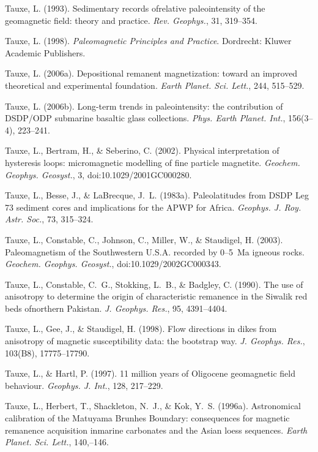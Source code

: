 \documentclass[,plain]{tauxe}
\begin{document}
\begin{thebibliography}{}
\bibitem{}%
Tauxe, L. (1993).
Sedimentary records of\break relative paleointensity of the geomagnetic field: theory and practice.
{\it Rev. Geophys.}, 31, 319--354.

\bibitem{}%
Tauxe, L. (1998).
{\it Paleomagnetic Principles and Practice}.
Dordrecht: Kluwer Academic Publishers.

\bibitem{}%
Tauxe, L. (2006a).
Depositional remanent magnetization: toward an improved theoretical and experimental foundation.
{\it Earth Planet. Sci. Lett.}, 244, 515--529.

\bibitem{}%
Tauxe, L. (2006b).
Long-term trends in paleointensity: the contribution of DSDP/ODP submarine basaltic glass collections.
{\it Phys. Earth Planet. Int.}, 156(3--4), 223--241.

\bibitem{}%
Tauxe, L., Bertram, H., \& Seberino, C. (2002).
Physical interpretation of hysteresis loops: micromagnetic modelling of fine particle magnetite.
{\it Geochem. Geophys. Geosyst.}, 3, doi:10.1029/2001GC000280.

\bibitem{}%
Tauxe, L., Besse, J., \& LaBrecque, J.~L. (1983a).
Paleolatitudes from DSDP Leg 73 sediment cores and implications for the APWP for Africa.
{\it Geophys. J. Roy. Astr. Soc.}, 73, 315--324.

\bibitem{}%
Tauxe, L., Constable, C., Johnson, C., Miller, W., \& Staudigel, H. (2003).
Paleomagnetism of the Southwestern U.S.A. recorded by 0--5~Ma igneous rocks.
{\it Geochem. Geophys. Geosyst.}, doi:10.1029/2002GC000343.

\bibitem{}%
Tauxe, L., Constable, C.~G., Stokking, L.~B., \& Badgley, C. (1990).
The use of anisotropy to determine the origin of characteristic remanence in the Siwalik red beds of\break northern Pakistan.
{\it J. Geophys. Res.}, 95, 4391--4404.

\bibitem{}%
Tauxe, L., Gee, J., \& Staudigel, H. (1998).
Flow directions in dikes from anisotropy of magnetic susceptibility data: the bootstrap way.
{\it J. Geophys. Res.}, 103(B8), 17775--17790.

\bibitem{}%
Tauxe, L., \& Hartl, P. (1997).
11 million years of Oligocene geomagnetic field behaviour.
{\it Geophys. J. Int.}, 128, 217--229.

\bibitem{}%
Tauxe, L., Herbert, T., Shackleton, N.~J., \& Kok, Y.~S. (1996a).
Astronomical calibration of the Matuyama Brunhes Boundary: consequences for magnetic remanence acquisition in\break marine carbonates and the Asian loess sequences.
{\it Earth Planet. Sci. Lett.}, 140,--146.


\end{thebibliography}
\end{document}
